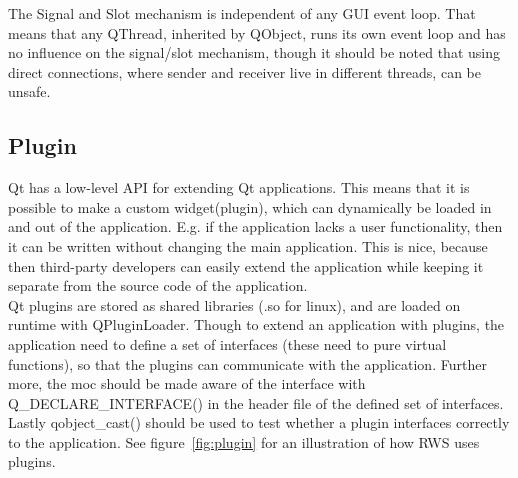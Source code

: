 The Signal and Slot mechanism is independent of any GUI event loop. That means that any QThread, inherited by QObject, runs its own event loop and  has no influence on the signal/slot mechanism, though it should be noted that using direct connections, where sender and receiver live in different threads, can be unsafe.




\subsection{Plugin}
\label{sec:plugin}
Qt has a low-level API for extending Qt applications. This means that it is possible to make a custom widget(plugin), which can dynamically be loaded in and out of the application. E.g. if the application lacks a user functionality, then it can be written without changing the main application. This is nice, because then third-party developers can easily extend the application while keeping it separate from the source code of the application.\\

Qt plugins are stored as shared libraries (.so for linux), and are loaded on runtime with QPluginLoader. Though to extend an application with plugins, the application need to define a set of interfaces (these need to pure virtual functions), so that the plugins can communicate with the application. Further more, the moc should be made aware of the interface with Q\_DECLARE\_INTERFACE() in the header file of the defined set of interfaces. Lastly qobject\_cast() should be used to test whether a plugin interfaces correctly to the application. See figure~\ref{fig:plugin} for an illustration of how RWS uses plugins.\\


